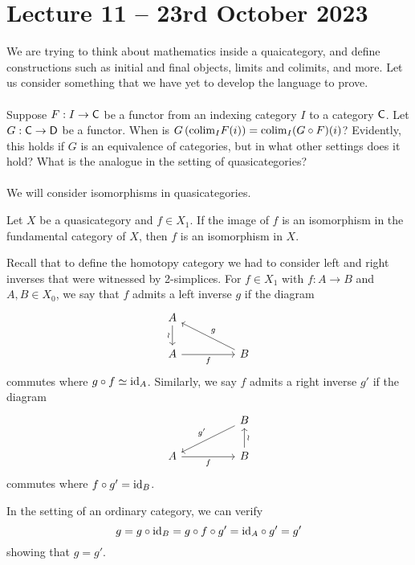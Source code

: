 \section{Lecture 11 -- 23rd October 2023}
We are trying to think about mathematics inside a quaicategory, and define constructions such as initial and final objects, limits and colimits, and more. Let us consider something that we have yet to develop the language to prove. 
\\\\
Suppose $F:I\to\mathsf{C}$ be a functor from an indexing category $I$ to a category $\mathsf{C}$. Let $G:\mathsf{C}\to\mathsf{D}$ be a functor. When is $G\left(\mathrm{colim}_{I}F(i)\right)=\mathrm{colim}_{I}(G\circ F)(i)$? Evidently, this holds if $G$ is an equivalence of categories, but in what other settings does it hold? What is the analogue in the setting of quasicategories?
\\\\
We will consider isomorphisms in quasicategories. 
\begin{definition}[Joyal]\label{def: quasicategory isomorphism}
    Let $X$ be a quasicategory and $f\in X_{1}$. If the image of $f$ is an isomorphism in the fundamental category of $X$, then $f$ is an isomorphism in $X$. 
\end{definition}
Recall that to define the homotopy category we had to consider left and right inverses that were witnessed by 2-simplices. For $f\in X_{1}$ with $f:A\to B$ and $A,B\in X_{0}$, we say that $f$ admits a left inverse $g$ if the diagram 
$$%
\begin{tikzcd}
	A \\
	A && B
	\arrow["\wr"', from=1-1, to=2-1]
	\arrow["f"', from=2-1, to=2-3]
	\arrow["g"', from=2-3, to=1-1]
\end{tikzcd}$$
commutes where $g\circ f\simeq\mathrm{id}_{A}$. Similarly, we say $f$ admits a right inverse $g'$ if the diagram 
$$%
\begin{tikzcd}
	&& B \\
	A && B
	\arrow["\wr"', from=2-3, to=1-3]
	\arrow["{g'}"', from=1-3, to=2-1]
	\arrow["f"', from=2-1, to=2-3]
\end{tikzcd}$$
commutes where $f\circ g'=\mathrm{id}_{B}$. 
\begin{remark}
    In the setting of an ordinary category, we can verify 
    $$g=g\circ\mathrm{id}_{B}=g\circ f\circ g'=\mathrm{id}_{A}\circ g'=g'$$
    showing that $g=g'$. 
\end{remark}
